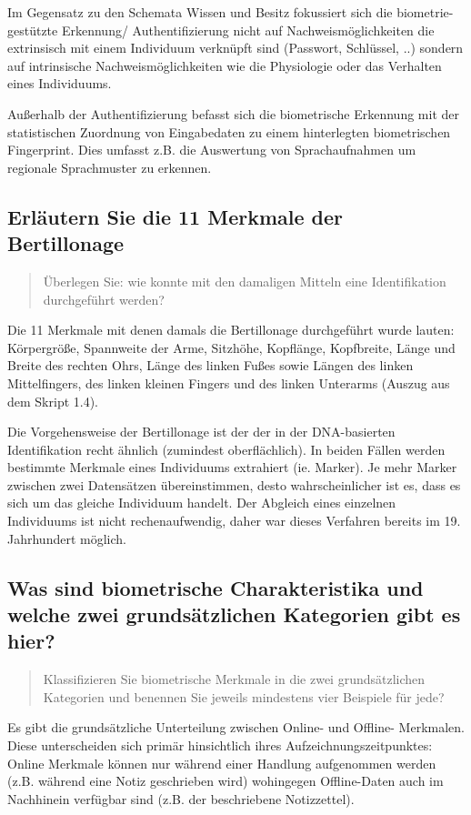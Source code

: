 \documentclass{article}
\newcommand{\annotation}[1]{
    \begin{quote}
    	\begin{textit}{#1}\end{textit}
    \end{quote}
}
\begin{document}
Im Gegensatz zu den Schemata Wissen und Besitz fokussiert sich die biometrie-gestützte Erkennung/
Authentifizierung nicht auf Nachweismöglichkeiten die extrinsisch mit einem Individuum verknüpft sind 
(Passwort, Schlüssel, ..) sondern auf intrinsische Nachweismöglichkeiten wie die Physiologie oder das
Verhalten eines Individuums.

Außerhalb der Authentifizierung befasst sich die biometrische Erkennung mit der statistischen Zuordnung 
von Eingabedaten zu einem hinterlegten biometrischen Fingerprint. Dies umfasst z.B. die Auswertung von 
Sprachaufnahmen um regionale Sprachmuster zu erkennen.

\subsection{Erläutern Sie die 11 Merkmale der Bertillonage}
\annotation{{\"U}berlegen Sie: wie konnte mit den damaligen Mitteln eine Identifikation durchgeführt werden?}

Die 11 Merkmale mit denen damals die Bertillonage durchgeführt wurde lauten: Körpergröße, Spannweite der 
Arme, Sitzhöhe, Kopflänge, Kopfbreite, Länge und Breite des rechten Ohrs, Länge des linken Fußes sowie 
Längen des linken Mittelfingers, des linken kleinen Fingers und des linken Unterarms (Auszug aus dem 
Skript 1.4).

Die Vorgehensweise der Bertillonage ist der der in der DNA-basierten Identifikation recht ähnlich (zumindest 
oberflächlich). In beiden Fällen werden bestimmte Merkmale eines Individuums extrahiert (ie. Marker).
Je mehr Marker zwischen zwei Datensätzen übereinstimmen, desto wahrscheinlicher ist es, dass es sich um 
das gleiche Individuum handelt. Der Abgleich eines einzelnen Individuums ist nicht rechenaufwendig, daher 
war dieses Verfahren bereits im 19. Jahrhundert möglich.

\subsection{Was sind biometrische Charakteristika und welche zwei grundsätzlichen Kategorien gibt es hier?}
\annotation{Klassifizieren Sie biometrische Merkmale in die zwei grundsätzlichen Kategorien und benennen Sie jeweils mindestens vier Beispiele für jede?}	

Es gibt die grundsätzliche Unterteilung zwischen Online- und Offline- Merkmalen. Diese unterscheiden sich
primär hinsichtlich ihres Aufzeichnungszeitpunktes: Online Merkmale können nur während einer Handlung 
aufgenommen werden (z.B. während eine Notiz geschrieben wird) wohingegen Offline-Daten auch im Nachhinein
verfügbar sind (z.B. der beschriebene Notizzettel).
\end{document}
